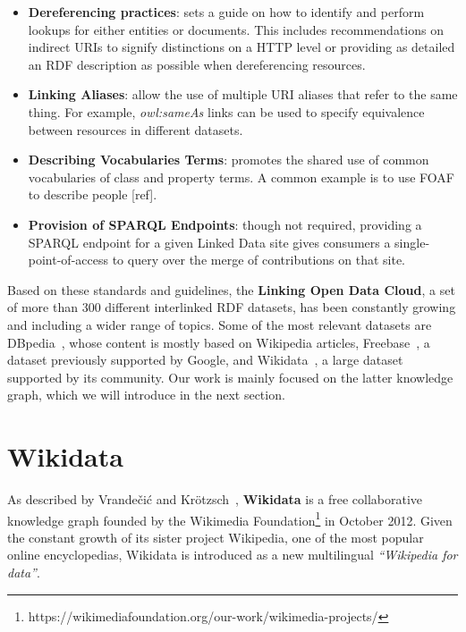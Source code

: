\begin{itemize}
    \item \textbf{Dereferencing practices}: sets a guide on how to identify and perform lookups 
    for either entities or documents. This includes recommendations on indirect URIs to signify 
    distinctions on a HTTP level or providing as detailed an RDF description as possible when 
    dereferencing resources. 
    \item \textbf{Linking Aliases}: allow the use of multiple URI aliases that refer to the same 
    thing. For example, \textit{owl:sameAs} links can be used to specify equivalence between 
    resources in different datasets.
    \item \textbf{Describing Vocabularies Terms}: promotes the shared use of common vocabularies 
    of class and property terms. A common example is to use FOAF to describe people [ref].
    \item \textbf{Provision of SPARQL Endpoints}: though not required, providing a SPARQL endpoint 
    for a given Linked Data site gives consumers a single-point-of-access to query over the merge 
    of contributions on that site.
\end{itemize} %

Based on these standards and guidelines, the \textbf{Linking Open Data Cloud}, a set of more than 
300 different interlinked RDF datasets, has been constantly growing and including a wider range of 
topics. Some of the most relevant datasets are DBpedia~\cite{KG:dbpedia}, whose content is mostly 
based on Wikipedia articles, Freebase~\cite{KG:freebase}, a dataset previously supported by Google, 
and Wikidata~\cite{KG:wikidata}, a large dataset supported by its community. Our work is mainly 
focused on the latter knowledge graph, which we will introduce in the next section.

\section{Wikidata} 
As described by Vrandečić and Krötzsch~\cite{KG:wikidata}, \textbf{Wikidata} is a free 
collaborative knowledge graph founded by the Wikimedia Foundation\footnote{https://wikimediafoundation.org/our-work/wikimedia-projects/} 
in October 2012. Given the constant growth of its sister project Wikipedia, one of the most 
popular online encyclopedias, Wikidata is introduced as a new multilingual 
\textit{“Wikipedia for data”}. 

